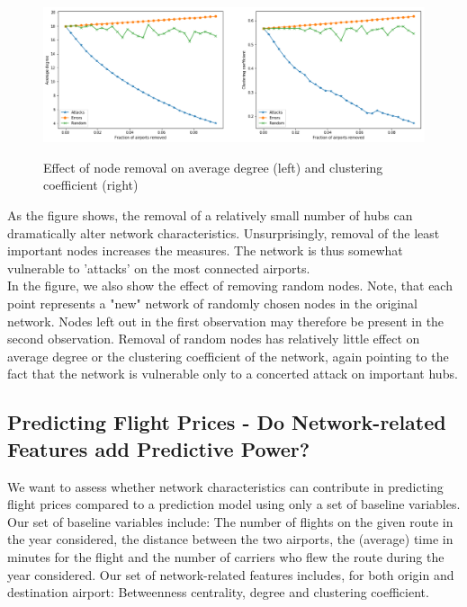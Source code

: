 \begin{figure}[H]
  \centering
  \caption{Effect of node removal on average degree (left) and clustering coefficient (right)}
    \includegraphics[width=1. \textwidth]{Exam/Figures/attacksanderrors.png}
  \label{fig:attacks_and_errors}
\end{figure}
As the figure shows, the removal of a relatively small number of hubs can dramatically alter network characteristics. Unsurprisingly, removal of the least important nodes increases the measures. The network is thus somewhat vulnerable to 'attacks' on the most connected airports. \\ In the figure, we also show the effect of removing random nodes. Note, that each point represents a "new" network of randomly chosen nodes in the original network. Nodes left out in the first observation may therefore be present in the second observation.  Removal of random nodes has relatively little effect on average degree or the clustering coefficient of the network, again pointing to the fact that the network is vulnerable only to a concerted attack on important hubs. \\ 

\subsection{Predicting Flight Prices - Do Network-related Features add Predictive Power?}
We want to assess whether network characteristics can contribute in predicting flight prices compared to a prediction model using only a set of baseline variables. Our set of baseline variables include: The number of flights on the given route in the year considered, the distance between the two airports, the (average) time in minutes for the flight and the number of carriers who flew the route during the year considered. Our set of network-related features includes, for both origin and destination airport: Betweenness centrality, degree and clustering coefficient. \\

